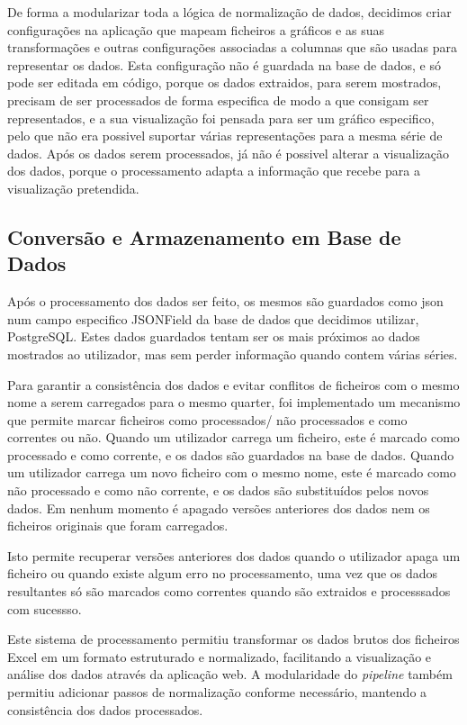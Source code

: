 De forma a modularizar toda a lógica de normalização de dados, decidimos criar configurações na aplicação que mapeam ficheiros a gráficos e as suas transformações e outras configurações associadas a columnas que são usadas para representar os dados. Esta configuração não é guardada na base de dados, e só pode ser editada em código, porque os dados extraidos, para serem mostrados, precisam de ser processados de forma especifica de modo a que consigam ser representados, e a sua visualização foi pensada para ser um gráfico especifico, pelo que não era possivel suportar várias representações para a mesma série de dados. Após os dados serem processados, já não é possivel alterar a visualização dos dados, porque o processamento adapta a informação que recebe para a visualização pretendida.

\subsection{Conversão e Armazenamento em Base de Dados}

Após o processamento dos dados ser feito, os mesmos são guardados como \gls{json} num campo especifico JSONField da base de dados que decidimos utilizar, PostgreSQL. Estes dados guardados tentam ser os mais próximos ao dados mostrados ao utilizador, mas sem perder informação quando contem várias séries.

Para garantir a consistência dos dados e evitar conflitos de ficheiros com o mesmo nome a serem carregados para o mesmo quarter, foi implementado um mecanismo que permite marcar ficheiros como processados/ não processados e como correntes ou não. Quando um utilizador carrega um ficheiro, este é marcado como processado e como corrente, e os dados são guardados na base de dados. Quando um utilizador carrega um novo ficheiro com o mesmo nome, este é marcado como não processado e como não corrente, e os dados são substituídos pelos novos dados. Em nenhum momento é apagado versões anteriores dos dados nem os ficheiros originais que foram carregados.

Isto permite recuperar versões anteriores dos dados quando o utilizador apaga um ficheiro ou quando existe algum erro no processamento, uma vez que os dados resultantes só são marcados como correntes quando são extraidos e processsados com sucessso.

Este sistema de processamento permitiu transformar os dados brutos dos ficheiros Excel em um formato estruturado e normalizado, facilitando a visualização e análise dos dados através da aplicação web. A modularidade do \textit{pipeline} também permitiu adicionar passos de normalização conforme necessário, mantendo a consistência dos dados processados.

